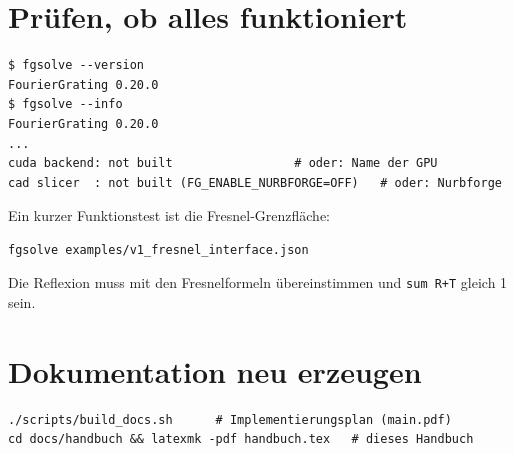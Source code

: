 \section{Prüfen, ob alles funktioniert}
\begin{lstlisting}[style=shell]
$ fgsolve --version
FourierGrating 0.20.0
$ fgsolve --info
FourierGrating 0.20.0
...
cuda backend: not built                 # oder: Name der GPU
cad slicer  : not built (FG_ENABLE_NURBFORGE=OFF)   # oder: Nurbforge
\end{lstlisting}
Ein kurzer Funktionstest ist die Fresnel-Grenzfläche:
\begin{lstlisting}[style=shell]
fgsolve examples/v1_fresnel_interface.json
\end{lstlisting}
Die Reflexion muss mit den Fresnelformeln übereinstimmen und \texttt{sum R+T} gleich 1 sein.

\section{Dokumentation neu erzeugen}
%
\begin{lstlisting}[style=shell]
./scripts/build_docs.sh      # Implementierungsplan (main.pdf)
cd docs/handbuch && latexmk -pdf handbuch.tex   # dieses Handbuch
\end{lstlisting}
